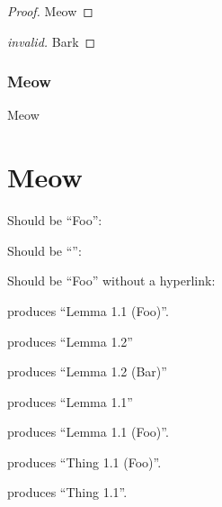 \documentclass{article}
\begin{document}
%

\begin{proof}
  Meow
\end{proof}

\begin{proof}[invalid]
  Bark
\end{proof}


\subsubsection{Meow}
Meow

\section{Meow}
\label{sec:meow}

\begin{lemma}[Foo] \label{lem:foo} \end{lemma}
\begin{lemma} \label{lem:anon} \end{lemma}

Should be ``Foo'': 

Should be ``'': 

Should be ``Foo'' without a hyperlink: 

 produces ``Lemma 1.1 (Foo)''.

 produces ``Lemma 1.2''

 produces ``Lemma 1.2 (Bar)''

 produces ``Lemma 1.1''

 produces ``Lemma 1.1 (Foo)''.

 produces ``Thing 1.1 (Foo)''.

 produces ``Thing 1.1''.
\end{document}
